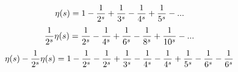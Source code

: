 \documentclass{article}
\begin{document}
\begin{equation}
\eta(s)= 1 - {1\over2^s} + {1\over3^s} - {1\over4^s} + {1\over5^s} - ...
\end{equation}
\begin{equation}
{1\over2^s} \eta(s) = {1\over2^s} - {1\over4^s} + {1\over6^s} - {1\over8^s} + {1\over10^s} - ...
\end{equation}
\begin{equation}
\eta(s) - {1\over2^s} \eta(s) = 1 - {1\over2^s} - {1\over2^s} + {1\over3^s} - {1\over4^s} - {1\over4^s} + {1\over5^s} - {1\over6^s} - {1\over6^s}
\end{equation}
\end{document}
